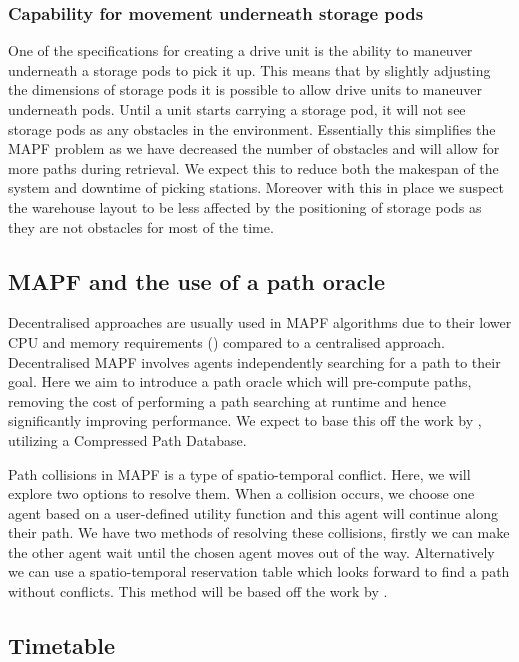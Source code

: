 \documentclass[a4paper,11pt]{article}
\begin{document}
\subsubsection{Capability for movement underneath storage pods}
\label{beneathpods}
One of the specifications for creating a drive unit is the ability to maneuver underneath a storage pods to pick it up. This means that by slightly adjusting the dimensions of storage pods it is possible to allow drive units to maneuver underneath pods. Until a unit starts carrying a storage pod, it will not see storage pods as any obstacles in the environment. Essentially this simplifies the MAPF problem as we have decreased the number of obstacles and will allow for more  paths during retrieval. We expect this to reduce both the makespan of the system and downtime of picking stations. Moreover with this in place we suspect the warehouse layout to be less affected by the positioning of storage pods as they are not obstacles for most of the time.

\subsection{MAPF and the use of a path oracle}
\label{pathoracle}
Decentralised approaches are usually used in MAPF algorithms due to their lower CPU and memory requirements (\cite{wang2009bridging}) compared to a centralised approach. Decentralised MAPF involves agents independently searching for a path to their goal. Here we aim to introduce a path oracle which will pre-compute paths, removing the cost of performing a path searching at runtime and hence significantly improving performance. We expect to base this off the work by \cite{strasser2015compressing}, utilizing a Compressed Path Database.

Path collisions in MAPF is a type of spatio-temporal conflict. Here, we will explore two options to resolve them. When a collision occurs, we choose one agent based on a user-defined utility function and this agent will continue along their path. We have two methods of resolving these collisions, firstly we can make the other agent wait until the chosen agent moves out of the way. Alternatively we can use a spatio-temporal reservation table which looks forward to find a path without conflicts. This method will be based off the work by \cite{wilt2014spatially}.


\subsection{Timetable}
\end{document}
